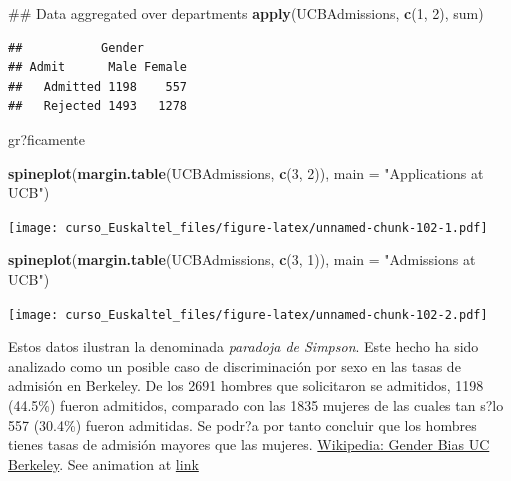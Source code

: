 \documentclass[]{book}
\newenvironment{Shaded}{\begin{snugshade}}{\end{snugshade}}
\newcommand{\KeywordTok}[1]{\textcolor[rgb]{0.13,0.29,0.53}{\textbf{#1}}}
\newcommand{\DataTypeTok}[1]{\textcolor[rgb]{0.13,0.29,0.53}{#1}}
\newcommand{\DecValTok}[1]{\textcolor[rgb]{0.00,0.00,0.81}{#1}}
\newcommand{\StringTok}[1]{\textcolor[rgb]{0.31,0.60,0.02}{#1}}
\newcommand{\NormalTok}[1]{#1}
\begin{document}
\begin{Shaded}
\begin{Highlighting}[]
\NormalTok{## Data aggregated over departments}
\KeywordTok{apply}\NormalTok{(UCBAdmissions, }\KeywordTok{c}\NormalTok{(}\DecValTok{1}\NormalTok{, }\DecValTok{2}\NormalTok{), sum)}
\end{Highlighting}
\end{Shaded}

\begin{verbatim}
##           Gender
## Admit      Male Female
##   Admitted 1198    557
##   Rejected 1493   1278
\end{verbatim}

gr?ficamente

\begin{Shaded}
\begin{Highlighting}[]
\KeywordTok{spineplot}\NormalTok{(}\KeywordTok{margin.table}\NormalTok{(UCBAdmissions, }\KeywordTok{c}\NormalTok{(}\DecValTok{3}\NormalTok{, }\DecValTok{2}\NormalTok{)),}
           \DataTypeTok{main =} \StringTok{"Applications at UCB"}\NormalTok{)}
\end{Highlighting}
\end{Shaded}

\texttt{[image: curso\_Euskaltel\_files/figure-latex/unnamed-chunk-102-1.pdf]}

\begin{Shaded}
\begin{Highlighting}[]
\KeywordTok{spineplot}\NormalTok{(}\KeywordTok{margin.table}\NormalTok{(UCBAdmissions, }\KeywordTok{c}\NormalTok{(}\DecValTok{3}\NormalTok{, }\DecValTok{1}\NormalTok{)),}
           \DataTypeTok{main =} \StringTok{"Admissions at UCB"}\NormalTok{)}
\end{Highlighting}
\end{Shaded}

\texttt{[image: curso\_Euskaltel\_files/figure-latex/unnamed-chunk-102-2.pdf]}

Estos datos ilustran la denominada \emph{paradoja de Simpson}. Este
hecho ha sido analizado como un posible caso de discriminación por sexo
en las tasas de admisión en Berkeley. De los 2691 hombres que
solicitaron se admitidos, 1198 (44.5\%) fueron admitidos, comparado con
las 1835 mujeres de las cuales tan s?lo 557 (30.4\%) fueron admitidas.
Se podr?a por tanto concluir que los hombres tienes tasas de admisión
mayores que las mujeres.
\href{https://en.wikipedia.org/wiki/Simpson\%27s_paradox\#UC_Berkeley_gender_bias}{Wikipedia:
Gender Bias UC Berkeley}. See animation at
\href{http://vudlab.com/simpsons/}{link}
\end{document}
